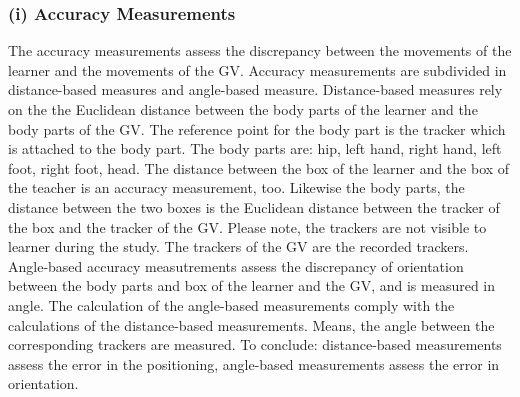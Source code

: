 \subsubsection{(i) Accuracy Measurements}
The accuracy measurements assess the discrepancy between the movements of the learner and the movements of the GV. Accuracy measurements are subdivided in distance-based measures and angle-based measure. Distance-based measures rely on the the Euclidean distance between the body parts of the learner and the body parts of the GV. The reference point for the body part is the tracker which is attached to the body part. The body parts are: hip, left hand, right hand, left foot, right foot, head. The distance between the box of the learner and the box of the teacher is an accuracy measurement, too. Likewise the body parts, the distance between the two boxes is the Euclidean distance between the tracker of the box and the tracker of the GV. Please note, the trackers are not visible to learner during the study. The trackers of the GV are the recorded trackers. Angle-based accuracy measutrements assess the discrepancy of orientation between the body parts and box of the learner and the GV, and is measured in angle. The calculation of the angle-based measurements comply with the calculations of the distance-based measurements. Means, the angle between the corresponding trackers are measured. To conclude: distance-based measurements assess the error in the positioning, angle-based measurements assess the error in orientation.

